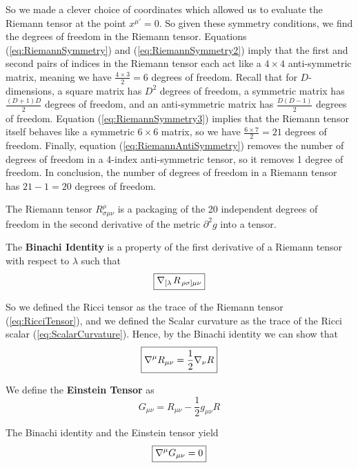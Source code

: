 \documentclass{article}
\begin{document}
 		So we made a clever choice of coordinates which allowed us to evaluate the Riemann tensor at the point $x^{\mu'} = 0$. So given these symmetry conditions, we find the degrees of freedom in the Riemann tensor. Equations (\ref{eq:RiemannSymmetry}) and (\ref{eq:RiemannSymmetry2}) imply that the first and second pairs of indices in the Riemann tensor each act like a $4 \times 4$ anti-symmetric matrix, meaning we have $\frac{4\times3}{2} = 6$ degrees of freedom. Recall that for $D$-dimensions, a square matrix has $D^2$ degrees of freedom, a symmetric matrix has $\frac{(D+1)D}{2}$ degrees of freedom, and an anti-symmetric matrix has $\frac{D(D-1)}{2}$ degrees of freedom. Equation (\ref{eq:RiemannSymmetry3}) implies that the Riemann tensor itself behaves like a symmetric $6 \times 6$ matrix, so we have $\frac{6\times7}{2}=21$ degrees of freedom. Finally, equation (\ref{eq:RiemannAntiSymmetry}) removes the number of degrees of freedom in a 4-index anti-symmetric tensor, so it removes 1 degree of freedom. In conclusion, the number of degrees of freedom in a Riemann tensor has $21-1=20$ degrees of freedom.
 		\begin{rem}
 			The Riemann tensor $R^\rho_{\sigma\mu\nu}$ is a packaging of the 20 independent degrees of freedom in the second derivative of the metric $\partial^2 g$ into a tensor.
 		\end{rem}
 		\begin{defn}
 			The \textbf{Binachi Identity} is a property of the first derivative of a Riemann tensor with respect to $\lambda$ such that
 			\begin{equation}
 				\label{eq:BinachiIdentity}
 				\boxed{\nabla_{\left[\lambda \right.} R_{\left. \rho \sigma \right] \mu\nu}}
 			\end{equation}
 		\end{defn}
 		So we defined the Ricci tensor as the trace of the Riemann tensor (\ref{eq:RicciTensor}), and we defined the Scalar curvature as the trace of the Ricci scalar (\ref{eq:ScalarCurvature}). Hence, by the Binachi identity we can show that
 		\begin{equation}
 			\label{eq:BinachiIdentityApplied}
 			\boxed{\nabla^\mu R_{\mu\nu} = \frac12 \nabla_\nu R}
 		\end{equation}
 		\begin{defn}
 			We define the \textbf{Einstein Tensor} as
 			\begin{equation}
 				\label{eq:EinsteinTensor}
 				\boxed{G_{\mu\nu} = R_{\mu\nu} - \frac12 g_{\mu\nu} R}
 			\end{equation}
 		\end{defn}
 		The Binachi identity and the Einstein tensor yield
 		\begin{equation}
 			\label{eq:EinsteinTensorBinachi}
 			\boxed{\nabla^\mu G_{\mu\nu} = 0}
 		\end{equation}
 		
\end{document}
